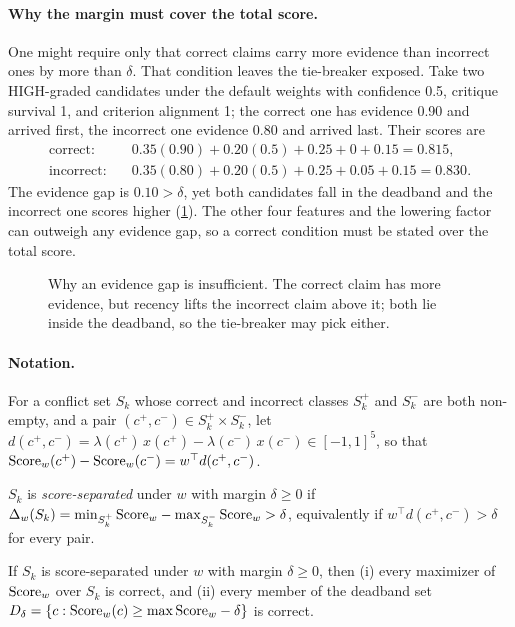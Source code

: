 \paragraph{Why the margin must cover the total score.} One might require only that correct claims carry more evidence than incorrect ones by more than $\delta$. That condition leaves the tie-breaker exposed. Take two HIGH-graded candidates under the default weights with confidence 0.5, critique survival 1, and criterion alignment 1; the correct one has evidence 0.90 and arrived first, the incorrect one evidence 0.80 and arrived last. Their scores are
\begin{align*}
  \textrm{correct:}\quad & 0.35(0.90) + 0.20(0.5) + 0.25 + 0 + 0.15 = 0.815,\\
  \textrm{incorrect:}\quad & 0.35(0.80) + 0.20(0.5) + 0.25 + 0.05 + 0.15 = 0.830.
\end{align*}
The evidence gap is $0.10 > \delta$, yet both candidates fall in the deadband and the incorrect one scores higher (\cref{fig:evidence-gap}). The other four features and the lowering factor can outweigh any evidence gap, so a correct condition must be stated over the total score.

\begin{figure}[t]
  \centering
  
  \caption{Why an evidence gap is insufficient. The correct claim has more evidence, but recency lifts the incorrect claim above it; both lie inside the deadband, so the tie-breaker may pick either.}
  \label{fig:evidence-gap}
\end{figure}

\paragraph{Notation.} For a conflict set $S_k$ whose correct and incorrect classes $S_k^+$ and $S_k^-$ are both non-empty, and a pair $(c^+, c^-) \in S_k^+ \times S_k^-$, let $d(c^+, c^-) = \lambda(c^+)\,x(c^+) - \lambda(c^-)\,x(c^-) \in [-1,1]^5$, so that $\mathrm{Score}_w(c^+) - \mathrm{Score}_w(c^-) = w^\top d(c^+, c^-)$.

\begin{definition}
\label{def:separation}
$S_k$ is \emph{score-separated} under $w$ with margin $\delta \geq 0$ if $\Delta_w(S_k) = \min_{S_k^+} \mathrm{Score}_w - \max_{S_k^-} \mathrm{Score}_w > \delta$, equivalently if $w^\top d(c^+, c^-) > \delta$ for every pair.
\end{definition}

\begin{proposition}
\label{prop:homogeneity}
If $S_k$ is score-separated under $w$ with margin $\delta \geq 0$, then (i) every maximizer of $\mathrm{Score}_w$ over $S_k$ is correct, and (ii) every member of the deadband set $D_\delta = \lbrace c : \mathrm{Score}_w(c) \geq \max \mathrm{Score}_w - \delta \rbrace$ is correct.
\end{proposition}

